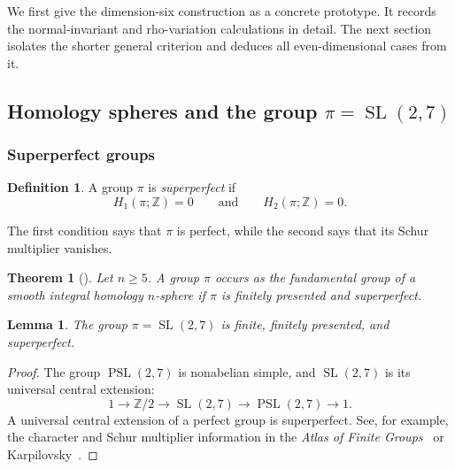 \documentclass[10pt,reqno]{amsart}
\numberwithin{equation}{section}
\newtheorem{theorem}{Theorem}
\newtheorem{lemma}{Lemma}
\theoremstyle{definition}
\newtheorem{definition}{Definition}
\theoremstyle{remark}
\newcommand{\Z}{\mathbb Z}
\newcommand{\SL}{\operatorname{SL}}
\newcommand{\PSL}{\operatorname{PSL}}
\begin{document}
We first give the dimension-six construction as a concrete prototype.
It records the normal-invariant and rho-variation calculations in
detail.  The next section isolates the shorter general criterion and
deduces all even-dimensional cases from it.

\subsection{Homology spheres and the group \texorpdfstring{\(\pi=\SL(2,7)\)}{pi=SL(2,7)}}

\subsubsection{Superperfect groups}

\begin{definition}
A group \(\pi\) is \emph{superperfect} if
\[
H_1(\pi;\Z)=0
\qquad\text{and}\qquad
H_2(\pi;\Z)=0.
\]
\end{definition}

The first condition says that \(\pi\) is perfect, while the second says
that its Schur multiplier vanishes.

\begin{theorem}[{\cite[Theorem 1]{KervaireHomologySpheres}}]\label{thm:kervaire-realization}
Let \(n\geq5\).  A group \(\pi\) occurs as the fundamental group of a
smooth integral homology \(n\)-sphere
if \(\pi\) is finitely
presented and superperfect.
\end{theorem}



\begin{lemma}\label{lem:sl27-superperfect}
The group \(\pi=\SL(2,7)\) is finite, finitely presented, and
superperfect.
\end{lemma}

\begin{proof}
The group \(\PSL(2,7)\) is nonabelian simple, and
\(\SL(2,7)\) is its universal central extension:
\[
1\longrightarrow \Z/2
\longrightarrow \SL(2,7)
\longrightarrow \PSL(2,7)
\longrightarrow1.
\]
A universal central extension of a perfect group is superperfect.
See, for example, the character and Schur multiplier information in
the \emph{Atlas of Finite Groups}~\cite{Atlas} or
Karpilovsky~\cite{Karpilovsky}.
\end{proof}
\end{document}

